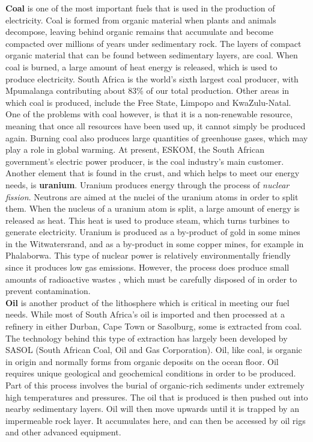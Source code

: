 \textbf{Coal} is one of the most important fuels that is used in the production of electricity. Coal is formed from organic material when plants and animals decompose, leaving behind organic remains that accumulate and become compacted over millions of years under sedimentary rock. The layers of compact organic material that can be found between sedimentary layers, are coal. When coal is burned, a large amount of heat energy is released, which is used to produce electricity. South Africa is the world's sixth largest coal producer, with Mpumalanga contributing about 83\% of our total production. Other areas in which coal is produced, include the Free State, Limpopo and KwaZulu-Natal. One of the problems with coal however, is that it is a non-renewable resource, meaning that once all resources have been used up, it cannot simply be produced again. Burning coal also produces large quantities of greenhouse gases, which may play a role in global warming. At present, ESKOM, the South African government's electric power producer, is the coal industry's main customer.\\

Another element that is found in the crust, and which helps to meet our energy needs, is \textbf{uranium}. Uranium produces energy through the process of \textit{nuclear fission}. Neutrons are aimed at the nuclei of the uranium atoms in order to split them. When the nucleus of a uranium atom is split, a large amount of energy is released as heat. This heat is used to produce steam, which turns turbines to generate electricity. Uranium is produced as a by-product of gold in some mines in the Witwatersrand, and as a by-product in some copper mines, for example in Phalaborwa. This type of nuclear power is relatively environmentally friendly since it produces low gas emissions. However, the process does produce small amounts of radioactive wastes , which must be carefully disposed of in order to prevent contamination.\\

\textbf{Oil} is another product of the lithosphere which is critical in meeting our fuel needs. While most of South Africa's oil is imported and then processed at a refinery in either Durban, Cape Town or Sasolburg, some is extracted from coal. The technology behind this type of extraction has largely been developed by SASOL (South African Coal, Oil and Gas Corporation). Oil, like coal, is organic in origin and normally forms from organic deposits on the ocean floor. Oil requires unique geological and geochemical conditions in order to be produced. Part of this process involves the burial of organic-rich sediments under extremely high temperatures and pressures. The oil that is produced is then pushed out into nearby sedimentary layers. Oil will then move upwards until it is trapped by an impermeable rock layer. It accumulates here, and can then be accessed by oil rigs and other advanced equipment.



